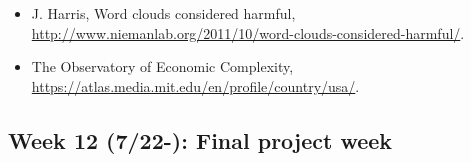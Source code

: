 \documentclass[11pt,article,oneside]{memoir} %
\begin{document}
\begin{itemize}\itemsep0em 
\item J. Harris, Word clouds considered harmful, \url{http://www.niemanlab.org/2011/10/word-clouds-considered-harmful/}. 
\item The Observatory of Economic Complexity, \url{https://atlas.media.mit.edu/en/profile/country/usa/}.
\end{itemize}	
\subsection{Week 12 (7/22-): Final project week}%
\end{document}
